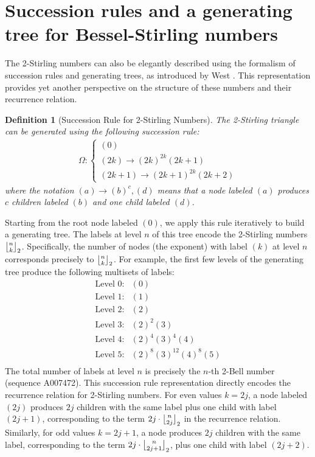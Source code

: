 \documentclass[a4paper]{amsart}
\newcommand{\mStirling}[0]{\genfrac{\lfloor}{\rfloor}{0pt}{}}
\newtheorem{definition}[theorem]{Definition}
\begin{document}
\section{Succession rules and a generating tree for Bessel-Stirling numbers}\label{sec-succession-rule}
\noindent The 2-Stirling numbers can also be elegantly described using the formalism of succession rules and generating trees, as introduced by West \cite{west_generating_1995}. This representation provides yet another perspective on the structure of these numbers and their recurrence relation.
\begin{definition}[Succession Rule for 2-Stirling Numbers]
The 2-Stirling triangle can be generated using the following succession rule:
\[
    \begin{aligned}
        \Omega: \begin{cases}
        (0) \\
        (2k) \to (2k)^{2k} (2k+1) \\
        (2k+1) \to (2k+1)^{2k}(2k+2)
        \end{cases}
    \end{aligned}
\]
where the notation $(a) \to (b)^c , (d)$ means that a node labeled $(a)$ produces $c$ children labeled $(b)$ and one child labeled $(d)$.
\end{definition}
Starting from the root node labeled $(0)$, we apply this rule iteratively to build a generating tree. The labels at level $n$ of this tree encode the 2-Stirling numbers $\mStirling{n}{k}_2$. Specifically, the number of nodes (the exponent) with label $(k)$ at level $n$ corresponds precisely to $\mStirling{n}{k}_2$.
For example, the first few levels of the generating tree produce the following multisets of labels:
\[
    \begin{aligned}
    \text{Level 0}: &{(0)} \\
    \text{Level 1}: &{(1)} \\
    \text{Level 2}: &{(2)} \\
    \text{Level 3}: &{(2)^2(3)} \\
    \text{Level 4}: &{(2)^4(3)^4(4)} \\
    \text{Level 5}: &{(2)^8(3)^{12}(4)^8(5)} \\
    \end{aligned}
\]
The total number of labels at level $n$ is precisely the $n$-th 2-Bell number (sequence A007472). This succession rule representation directly encodes the recurrence relation for 2-Stirling numbers. For even values $k = 2j$, a node labeled $(2j)$ produces $2j$ children with the same label plus one child with label $(2j+1)$, corresponding to the term $2j \cdot \mStirling{n}{2j}_2$ in the recurrence relation. Similarly, for odd values $k = 2j+1$, a node produces $2j$ children with the same label, corresponding to the term $2j \cdot \mStirling{n}{2j+1}_2$, plus one child with label $(2j+2)$.
\end{document}
